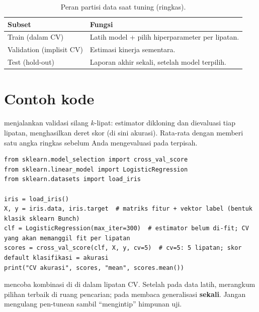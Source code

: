 \documentclass[../main.tex]{subfiles}
\begin{document}
\begin{table}[htbp]
\centering
\caption{Peran partisi data saat tuning (ringkas).}
\label{tab:partisi-tuning}
\begin{tabular}{@{}p{3.2cm}p{9.5cm}@{}}
\toprule
\textbf{Subset} & \textbf{Fungsi} \\
\midrule
Train (dalam CV) & Latih model + pilih hiperparameter per lipatan. \\
Validation (implisit CV) & Estimasi kinerja sementara. \\
Test (hold-out) & Laporan akhir sekali, setelah model terpilih. \\
\bottomrule
\end{tabular}
\end{table}

\section{Contoh kode}

\MulaiPenjelasanKode {} menjalankan validasi silang $k$-lipat: estimator  dikloning dan dievaluasi tiap lipatan, menghasilkan deret skor (di sini akurasi). Rata-rata dengan  memberi satu angka ringkas sebelum Anda mengevaluasi pada  terpisah. \SelesaiPenjelasanKode

\begin{lstlisting}[caption={Cross-val score pada Iris}]
from sklearn.model_selection import cross_val_score
from sklearn.linear_model import LogisticRegression
from sklearn.datasets import load_iris

iris = load_iris()
X, y = iris.data, iris.target  # matriks fitur + vektor label (bentuk klasik sklearn Bunch)
clf = LogisticRegression(max_iter=300)  # estimator belum di-fit; CV yang akan memanggil fit per lipatan
scores = cross_val_score(clf, X, y, cv=5)  # cv=5: 5 lipatan; skor default klasifikasi = akurasi
print("CV akurasi", scores, "mean", scores.mean())
\end{lstlisting}

\MulaiPenjelasanKode {} mencoba kombinasi di  di dalam lipatan CV. Setelah  pada data latih,  merangkum pilihan terbaik di ruang pencarian;  pada  membaca generalisasi \textbf{sekali}. Jangan mengulang pen-tunean sambil ``mengintip'' himpunan uji. \SelesaiPenjelasanKode
\end{document}
